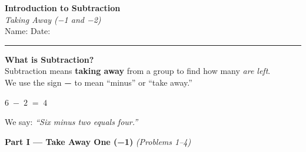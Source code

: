 \documentclass[12pt, letterpaper]{article}
\newcommand{\answerline}{\underline{\hspace{2.5cm}}}
\newcommand{\biganswerline}{\underline{\hspace{4cm}}}
\begin{document}
\begin{center}
  {\LARGE\textbf{\textcolor{scholared}{Introduction to Subtraction}}}\\[4pt]
  {\Large\textcolor{scholagold}{\textit{Taking Away (−1 and −2)}}}\\[6pt]
  {\small Name: \biganswerline \hspace{1cm} Date: \answerline}
\end{center}

\vspace{4pt}
\noindent\textcolor{scholared}{\rule{\linewidth}{1pt}}
\vspace{4pt}


\begin{lessonbox}
\textbf{What is Subtraction?}\\[4pt]
Subtraction means \textbf{taking away} from a group to find how many \textit{are left}.\\[6pt]
We use the sign \textbf{−} to mean ``minus'' or ``take away.''\\[8pt]
\begin{center}
\end{center}
\begin{center}
  \Large $6 \;-\; 2 \;=\; 4$
\end{center}
\medskip
\noindent We say: \textit{``Six minus two equals four.''}
\end{lessonbox}

\bigskip

\noindent\textcolor{scholared}{\large\textbf{Part I — Take Away One (−1)}} \hfill \textit{(Problems 1–4)}
\end{document}

